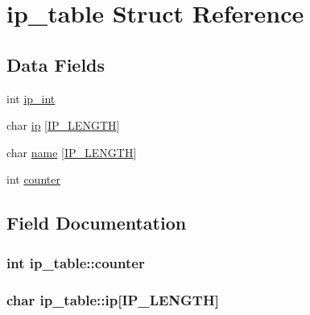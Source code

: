 \hypertarget{structip__table}{}\section{ip\+\_\+table Struct Reference}
\label{structip__table}
\subsection*{Data Fields}
\begin{DoxyCompactItemize}
\item 
int \hyperlink{structip__table_a164501eaaa381a490d1b477b6202a3f4}{ip\+\_\+int}
\item 
char \hyperlink{structip__table_a7554c8d4714d10c6a3c54aa9ada7fc29}{ip} \mbox{[}\hyperlink{ips_8c_a26af4e86634a5afbbe4ae1326886c9b2}{I\+P\+\_\+\+L\+E\+N\+G\+TH}\mbox{]}
\item 
char \hyperlink{structip__table_ad4659ea0a72b02aa01df50d759fa5954}{name} \mbox{[}\hyperlink{ips_8c_a26af4e86634a5afbbe4ae1326886c9b2}{I\+P\+\_\+\+L\+E\+N\+G\+TH}\mbox{]}
\item 
int \hyperlink{structip__table_a86455cd9e7c6fe05bdb4a0e1c1e78c55}{counter}
\end{DoxyCompactItemize}


\subsection{Field Documentation}
\subsubsection[{\texorpdfstring{counter}{counter}}]{\setlength{\rightskip}{0pt plus 5cm}int ip\+\_\+table\+::counter}\hypertarget{structip__table_a86455cd9e7c6fe05bdb4a0e1c1e78c55}{}\label{structip__table_a86455cd9e7c6fe05bdb4a0e1c1e78c55}
\subsubsection[{\texorpdfstring{ip}{ip}}]{\setlength{\rightskip}{0pt plus 5cm}char ip\+\_\+table\+::ip\mbox{[}{\bf I\+P\+\_\+\+L\+E\+N\+G\+TH}\mbox{]}}\hypertarget{structip__table_a7554c8d4714d10c6a3c54aa9ada7fc29}{}\label{structip__table_a7554c8d4714d10c6a3c54aa9ada7fc29}
